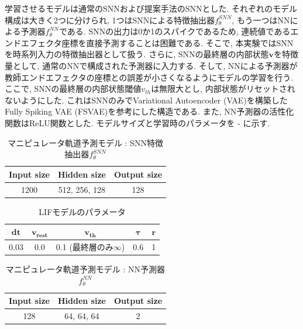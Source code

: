 学習させるモデルは通常のSNNおよび提案手法のSNNとした.
それぞれのモデル構成は大きく2つに分けられ, 1つはSNNによる特徴抽出器$f_{\theta}^{SNN}$, もう一つはNNによる予測器$f_{\theta}^{NN}$である.
SNNの出力は0か1のスパイクであるため, 連続値であるエンドエフェクタ座標を直接予測することは困難である.
そこで, 本実験ではSNNを時系列入力の特徴抽出器として扱う.
さらに, SNNの最終層の内部状態$\bm{v}$を特徴量として, 通常のNNで構成された予測器に入力する.
そして, NNによる予測器が教師エンドエフェクタの座標との誤差が小さくなるようにモデルの学習を行う.
ここで, SNNの最終層の内部状態閾値$v_{th}$は無限大とし, 内部状態がリセットされないようにした.
これはSNNのみでVariational Autoencoder (VAE)を構築したFully Spiking VAE (FSVAE)\cite{fsvae}を参考にした構造である.
また, NN予測器の活性化関数はReLU関数とした.
モデルサイズと学習時のパラメータを - に示す.
\begin{table}[htb] %
    \centering
    \caption{マニピュレータ軌道予測モデル : SNN特徴抽出器$f_{\theta}^{SNN}$}
    \label{tab:exp3:model:snn}
    \begin{tabular}{ccc}
        \hline
        \textbf{Input size}& \textbf{Hidden size} & \textbf{Output size}\\
        \hline
        1200   & 512, 256, 128 & 128 \\
        \hline
    \end{tabular}
\end{table}

\begin{table}[htb]
    \centering
    \caption{LIFモデルのパラメータ}
    \label{tab:exp3:model:parameter:lif}
    \begin{tabular}{ccccc}
        \hline
        $\bm{dt}$& $\bm{v_{rest}}$ & $\bm{v_{th}}$ & $\bm{\tau}$ & $\bm{r}$\\
        \hline
        0.03   & 0.0 & 0.1 (最終層のみ$\infty$) & 0.6 & 1 \\
        \hline
    \end{tabular}
\end{table}

\begin{table}[htb] %
    \centering
    \caption{マニピュレータ軌道予測モデル : NN予測器$f_{\theta}^{NN}$}
    \label{tab:exp3:model:nn}
    \begin{tabular}{ccc}
        \hline
        \textbf{Input size}& \textbf{Hidden size} & \textbf{Output size}\\
        \hline
        128   & 64, 64, 64 & 2 \\
        \hline
    \end{tabular}
\end{table}

